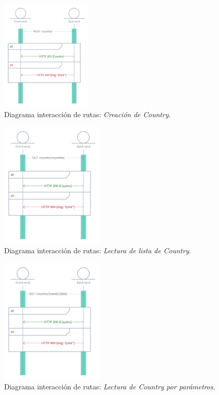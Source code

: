 \begin{figure}[H]
    \centering
    \myfloatalign
    \includegraphics[width=0.39\textwidth]{gfx/diagrama-itr2.png}
    \caption[Diagrama interacción de rutas (2)]{Diagrama interacción de rutas: \textit{Creación de Country}.}\label{gfx:diagrama-itr2}
\end{figure}

\begin{figure}[H]
    \centering
    \myfloatalign
    \includegraphics[width=0.44\textwidth]{gfx/diagrama-itr3.png}
    \caption[Diagrama interacción de rutas (3)]{Diagrama interacción de rutas: \textit{Lectura de lista de Country}.}\label{gfx:diagrama-itr3}
\end{figure}

\begin{figure}[H]
    \centering
    \myfloatalign
    \includegraphics[width=0.44\textwidth]{gfx/diagrama-itr4.png}
    \caption[Diagrama interacción de rutas (4)]{Diagrama interacción de rutas: \textit{Lectura de Country por parámetros}.}\label{gfx:diagrama-itr4}
\end{figure}

